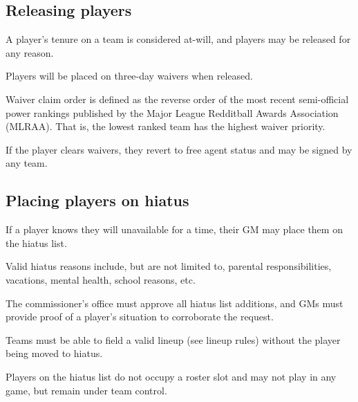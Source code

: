 \subsection{Releasing players}
\begin{deepEnumerate}
	\item A player's tenure on a team is considered at-will, 
	and players may be released for any reason.
	\item Players will be placed on three-day waivers when released.
	\begin{deepEnumerate}
		\item Waiver claim order is defined as the reverse order 
		of the most recent semi-official power rankings 
		published by the Major League Redditball Awards Association (MLRAA).
		That is, the lowest ranked team has the highest waiver priority.
		\item If the player clears waivers, 
		they revert to free agent status and may be signed by any team.
	\end{deepEnumerate}
\end{deepEnumerate}

\subsection{Placing players on hiatus}
\begin{deepEnumerate}
	\item If a player knows they will unavailable for a time,
	their GM may place them on the hiatus list.
	\begin{deepEnumerate}
		\item Valid hiatus reasons include, but are not limited to,
		parental responsibilities, vacations, mental health, school reasons, etc.
		\item The commissioner’s office must approve all hiatus list additions,
		and GMs must provide proof of a player's situation to corroborate the request.
		\item Teams must be able to field a valid lineup (see lineup rules) %
		without the player being moved to hiatus.
	\end{deepEnumerate}
	\item Players on the hiatus list do not occupy a roster slot
	and may not play in any game,
	but remain under team control.
\end{deepEnumerate}

